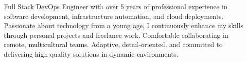 

\begin{cvparagraph}

Full Stack DevOps Engineer with over 5 years of professional experience in software development, infrastructure automation, and cloud deployments. Passionate about technology from a young age, I continuously enhance my skills through personal projects and freelance work. Comfortable collaborating in remote, multicultural teams. Adaptive, detail-oriented, and committed to delivering high-quality solutions in dynamic environments.\end{cvparagraph}
